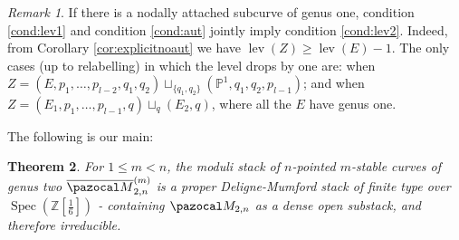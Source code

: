 \documentclass{compositio}
\newcommand{\PP}{\mathbb P}
\newcommand{\oM}{\overline{\pazocal M}}
\newcommand{\lev}{\operatorname{lev}}
\theoremstyle{plain}
\newtheorem{thm}{Theorem}[section]
\theoremstyle{definition}
\theoremstyle{remark}
\newtheorem{rem}[thm]{Remark}
\begin{document}
\begin{rem}\label{rmk:lev1solev2}
 If there is a nodally attached subcurve of genus one, condition \eqref{cond:lev1} and condition \eqref{cond:aut} jointly imply condition \eqref{cond:lev2}. Indeed, from Corollary \ref{cor:explicitnoaut} we have $\lev(Z)\geq\lev(E)-1$. The only cases (up to relabelling) in which the level drops by one are: when $Z=(E,p_1,\ldots,p_{l-2},q_1,q_2)\sqcup_{\{q_1,q_2\}}(\PP^1,q_1,q_2,p_{l-1})$; and when $Z=(E_1,p_1,\ldots,p_{l-1},q)\sqcup_q(E_2,q)$, where all the $E$ have genus one.
\end{rem}


The following is our main:
{
\begin{thm}
 For $1\leq m <n$, the moduli stack of $n$-pointed $m$-stable curves of genus two $\oM_{2,n}^{(m)}$ is a proper Deligne-Mumford stack of finite type over $\operatorname{Spec}(\mathbb Z[\frac{1}{6}])$ - containing $\pazocal M_{2,n}$ as a dense open substack, and therefore irreducible.
\end{thm}}
\end{document}
